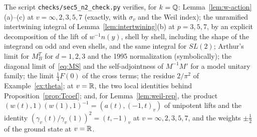 \begin{remarkrev}\label{rem:verified-sec5}
The script \texttt{checks/sec5\_n2\_check.py} verifies, for $k=\mathbb{Q}$:
Lemma~\ref{lem:w-action}(a)--(c) at $v=\infty,2,3,5,7$ (exactly, with
$\sigma_v$ and the Weil index); the unramified intertwining integral of
Lemma~\ref{lem:intertwining}(b) at $p=3,5,7$, by an explicit
decomposition of the lift of $w^{-1}n(y)$, shell by shell, including the
shape of the integrand on odd and even shells, and the same integral for
$SL(2)$; Arthur's limit for $M_B^T$ for $d=1,2,3$ and the 1995
normalization (symbolically); the diagonal limit of~\eqref{eq:MS} and the
self-adjointness of $M^{-1}M'$ for a model unitary family; the limit
$\frac14F(0)$ of the cross terms; the residue $2/\pi^2$ of
Example~\ref{ex:theta}; at $v=\mathbb{R}$, the two local identities behind
Proposition~\ref{prop:Tcoef}; and, for Lemma~\ref{lem:weil-rep}, the
product $(w(t),1)(w(1),1)^{-1}=(a(t),(-1,t)_v)$ of unipotent lifts and the
identity $(\gamma_v(t)/\gamma_v(1))^2=(t,-1)_v$ at $v=\infty,2,3,5,7$, and
the weights $\pm\frac12$ of the ground state at $v=\mathbb{R}$.
\end{remarkrev}
